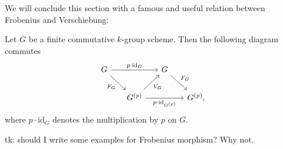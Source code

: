 \documentclass[../Main]{subfiles}
\begin{document}
We will conclude this section with a famous and useful relation between
Frobenius and Verschiebung:
\begin{thm}\label{thm:FrobeniusVerschiebungRelation}
	Let $G$ be a finite commutative $k$-group scheme. Then the following
	diagram commutes
	\begin{equation}
	\begin{tikzcd}[column sep=1.5em]
		G \arrow[rr, "p \cdot \mathrm{id}_{ G }", rightarrow] 
		\arrow[rd, "F_G"', rightarrow] & &
		G \arrow[rd, "F_G", rightarrow] & \\
		&
		G^{(p)} \arrow[ru, "V_G"', rightarrow] 
		\arrow[rr, "p \cdot \mathrm{id}_{ G^{(p)} }"', rightarrow] & &
		G^{(p)}
	,\end{tikzcd}
	\end{equation}
	where $p \cdot \mathrm{id}_{ G }$ denotes the multiplication by $p$
	on $G$.
\end{thm}


tk: should I write some examples for Frobenius morphism? Why not.
\end{document}
